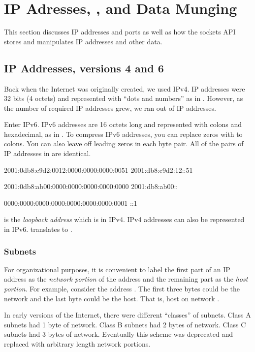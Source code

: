 \section{IP Adresses, , and Data Munging}
This section discusses IP addresses and ports as well as how the sockets API stores and manipulates IP addresses and other data.

\subsection{IP Addresses, versions 4 and 6}
Back when the Internet was originally created, we used IPv4. IP addresses were 32 bits (4 octets) and represented with ``dots and numbers'' as in . However, as the number of required IP addresses grew, we ran out of IP addresses. 

Enter IPv6. IPv6 addresses are 16 octets long and represented with colons and hexadecimal, as in . To compress IPv6 addresses, you can replace zeros with to colons. You can also leave off leading zeros in each byte pair. All of the pairs of IP addresses in  are identical.

\begin{CPP}[label=list:ip-address-pairs,caption=Identical IP Addresses]
2001:0db8:c9d2:0012:0000:0000:0000:0051
2001:db8:c9d2:12::51

2001:0db8:ab00:0000:0000:0000:0000:0000
2001:db8:ab00::

0000:0000:0000:0000:0000:0000:0000:0001
::1
\end{CPP}

 is the \emph{loopback address} which is  in IPv4. IPv4 addresses can also be represented in IPv6.  translates to .

\subsubsection{Subnets}
For organizational purposes, it is convenient to label the first part of an IP address as the \emph{network portion} of the address and the remaining part as the \emph{host portion}. For example, consider the address . The first three bytes could be the network and the last byte could be the host. That is, host  on network .

In early versions of the Internet, there were different ``classes'' of subnets. Class A subnets had 1 byte of network. Class B subnets had 2 bytes of network. Class C subnets had 3 bytes of network. Eventually this scheme was deprecated and replaced with arbitrary length network portions. 

